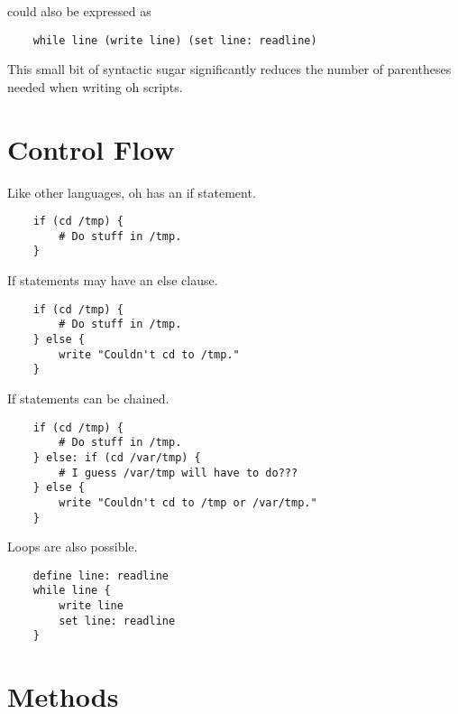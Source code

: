 \documentclass[12pt]{book}
\begin{document}
could also be expressed as

\begin{lstlisting}
	while line (write line) (set line: readline)
\end{lstlisting}

This small bit of syntactic sugar significantly reduces the number of
parentheses needed when writing oh scripts.


\section{Control Flow}

Like other languages, oh has an if statement.

\begin{lstlisting}
	if (cd /tmp) {
		# Do stuff in /tmp.
	}
\end{lstlisting}

If statements may have an else clause.

\begin{lstlisting}
	if (cd /tmp) {
		# Do stuff in /tmp.
	} else {
		write "Couldn't cd to /tmp."
	}
\end{lstlisting}

If statements can be chained.

\begin{lstlisting}
	if (cd /tmp) {
		# Do stuff in /tmp.
	} else: if (cd /var/tmp) {
		# I guess /var/tmp will have to do???
	} else {
		write "Couldn't cd to /tmp or /var/tmp."
	}
\end{lstlisting}

Loops are also possible.

\begin{lstlisting}
	define line: readline
	while line {
		write line
		set line: readline
	}
\end{lstlisting}

\section{Methods}




\end{document}
